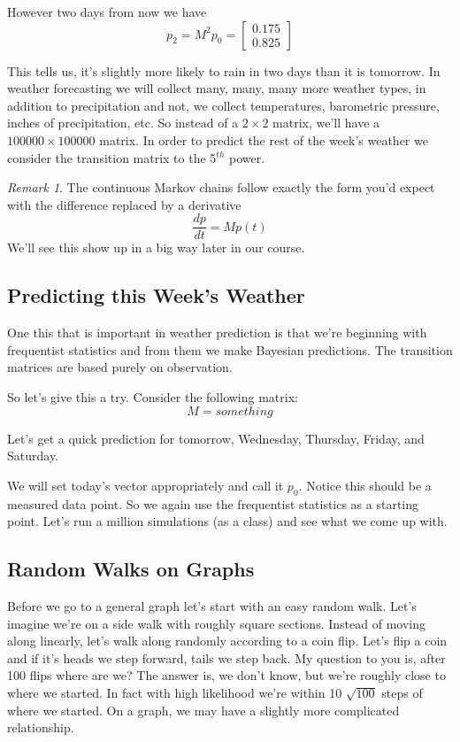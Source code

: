 \documentclass{article}
\theoremstyle{definition}
\theoremstyle{remark}
\newtheorem*{rem}{Remark}
\begin{document}
However two days from now we have
\[
p_2 = M^2 p_0 = \begin{bmatrix}
0.175 \\ 0.825
\end{bmatrix}
\]

This tells us, it's slightly more likely to rain in two days than it is tomorrow.  In weather forecasting we will collect many, many, many more weather types, in addition to precipitation and not, we collect temperatures, barometric pressure, inches of precipitation, etc. So instead of a $2\times 2$ matrix, we'll have a $100000\times 100000$ matrix.  In order to predict the rest of the week's weather we consider the transition matrix to the 5$^{th}$ power.


\begin{rem}
	The continuous Markov chains follow exactly the form you'd expect with the difference replaced by a derivative
	\[
	\frac{dp}{dt} = M p(t)
	\]
	We'll see this show up in a big way later in our course.
\end{rem}


\subsection{Predicting this Week's Weather}

One this that is important in weather prediction is that we're beginning with frequentist statistics and from them we make Bayesian predictions.  The transition matrices are based purely on observation.  

So let's give this a try.  Consider the following matrix:
\[
M = something
\]

Let's get a quick prediction for tomorrow, Wednesday, Thursday, Friday, and Saturday.

We will set today's vector appropriately and call it $p_0$. Notice this should be a measured data point.  So we again use the frequentist statistics as a starting point.  Let's run a million simulations (as a class) and see what we come up with.

\subsection{Random Walks on Graphs}

Before we go to a general graph let's start with an easy random walk.
Let's imagine we're on a side walk with roughly square sections.  Instead of moving along linearly, let's walk along randomly according to a coin flip.  Let's flip a coin and if it's heads we step forward, tails we step back.  My question to you is, after 100 flips where are we?  The answer is, we don't know, but we're roughly close to where we started.  In fact with high likelihood we're within 10 $\sqrt{100}$ steps of where we started. 
On a graph, we may have a slightly more complicated relationship.
\end{document}

